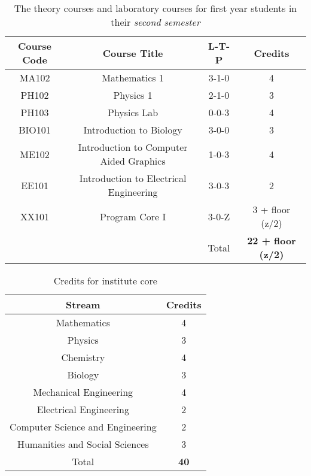 \begin{table}[t]
    \centering
    \begin{tabular}{c c c c}
        \toprule
        \textbf{Course Code} &  \textbf{Course Title} & \textbf{L-T-P} & \textbf{Credits} \\
        \midrule
        MA102   & Mathematics 1                             & 3-1-0 & 4 \\
        PH102   & Physics 1                                 & 2-1-0 & 3 \\
        PH103   & Physics Lab                               & 0-0-3 & 4 \\
        BIO101  & Introduction to Biology                   & 3-0-0 & 3 \\
        ME102   & Introduction to Computer Aided Graphics   & 1-0-3 & 4 \\
        EE101   & Introduction to Electrical Engineering    & 3-0-3 & 2 \\
        XX101   & Program Core I                            & 3-0-Z & 3 + floor (z/2) \\
        \midrule
        {}      & {}                                        & Total & \textbf{22 + floor (z/2)} \\
        \bottomrule
    \end{tabular}

    \caption{The theory courses and laboratory courses for first year \glspl{student} in their \textit{second semester}}
    \label{tab:second semester courses}
    
\end{table}

\begin{table}[b!]
    \centering
    \begin{tabular}{c c}
        \toprule
        \textbf{Stream}                     & \textbf{Credits} \\
        \midrule
        Mathematics                         & 4 \\
        Physics                             & 3 \\
        Chemistry                           & 4 \\
        Biology                             & 3 \\
        Mechanical Engineering              & 4 \\
        Electrical Engineering              & 2 \\
        Computer Science and Engineering    & 2 \\
        Humanities and Social Sciences      & 3\\
        \midrule
        Total & \textbf{40} \\
        \bottomrule
    \end{tabular}

    \caption{Credits for institute core}
    \label{tab:Credits for institute core}
    
\end{table}

